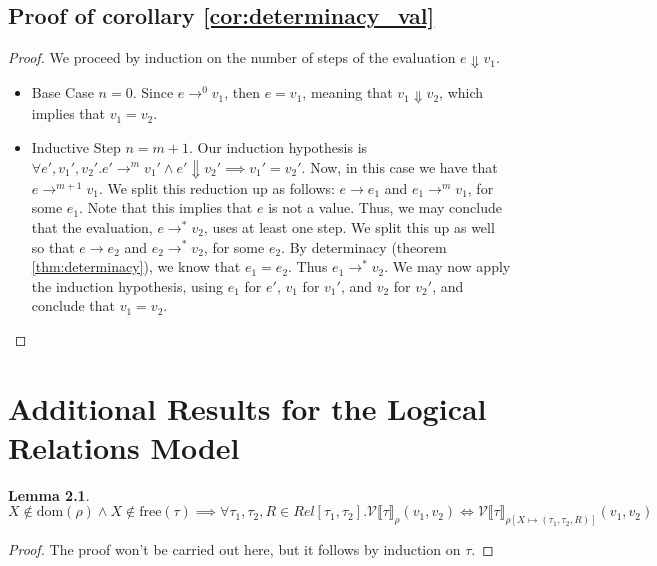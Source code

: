 \documentclass[twoside,11pt,openright]{report}
\newtheorem{lemma}[theorem]{Lemma}
\theoremstyle{definition}
\newcommand{\expr}{e}
\newcommand{\val}{v}
\newcommand{\Tvar}{X}
\newcommand{\typ}{\tau}
\newcommand{\step}{\rightarrow}
\newcommand{\stepS}{\rightarrow^*}
\newcommand{\ValInp}[2]{\mathcal{V} \llbracket #1 \rrbracket_{#2}}
\newcommand{\map}[2]{#1 \mapsto #2}
\begin{document}
\section{Proof of corollary \ref{cor:determinacy_val}}\label{appendix:om_proof:dtval}
\begin{proof}
  We proceed by induction on the number of steps of the evaluation $\expr \Downarrow \val_1$.
  \begin{itemize}
    \item Base Case $n = 0$. Since $\expr \step^0 \val_1$, then $\expr = \val_1$, meaning that $\val_1 \Downarrow \val_2$, which implies that $\val_1 = \val_2$.
    
    \item Inductive Step $n = m + 1$. Our induction hypothesis is $\forall \expr', \val_1', \val_2' . \expr' \step^m \val_1' \land \expr' \Downarrow \val_2' \implies \val_1' = \val_2'$.
    Now, in this case we have that $\expr \step^{m + 1} \val_1$. We split this reduction up as follows: $\expr \step \expr_1$ and $\expr_1 \step^m \val_1$, for some $\expr_1$. Note that this implies that $\expr$ is not a value. Thus, we may conclude that the evaluation, $\expr \stepS \val_2$, uses at least one step. We split this up as well so that $\expr \step \expr_2$ and $\expr_2 \stepS \val_2$, for some $\expr_2$. By determinacy (theorem \ref{thm:determinacy}), we know that $\expr_1 = \expr_2$. Thus $\expr_1 \stepS \val_2$. We may now apply the induction hypothesis, using $\expr_1$ for $\expr'$, $\val_1$ for $\val_1'$, and $\val_2$ for $\val_2'$, and conclude that $\val_1 = \val_2$.
  \end{itemize}
\end{proof}

\chapter{Additional Results for the Logical Relations Model}\label{appendix:LR_extra}

\begin{lemma}\label{lem:ValInpTypSub}
  $\Tvar \notin \mathrm{dom}(\rho) \land \Tvar \notin \mathrm{free}(\tau) \implies \forall \typ_1, \typ_2, R \in Rel[\typ_1, \typ_2] . \ValInp{\typ}{\rho}(\val_1, \val_2) \iff \ValInp{\typ}{\rho[\map{\Tvar}{(\typ_1, \typ_2, R)}]}(\val_1, \val_2)$
\end{lemma}
\begin{proof}
  The proof won't be carried out here, but it follows by induction on $\typ$.
\end{proof}
\end{document}
